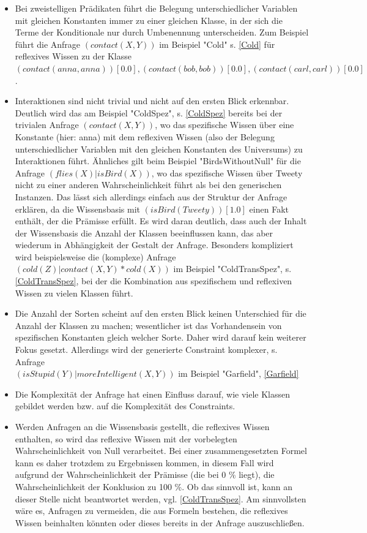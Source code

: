 \documentclass[draft]{scrreprt}
\begin{document}
\begin{itemize}
	\item Bei zweistelligen Prädikaten führt die Belegung unterschiedlicher Variablen mit gleichen Konstanten immer zu einer gleichen Klasse, in der sich die Terme der Konditionale nur durch Umbenennung unterscheiden. Zum Beispiel führt die Anfrage $ (contact(X,Y)) $ im Beispiel "{}Cold"{} s. \ref{Cold} für reflexives Wissen zu der Klasse $ (contact(anna,anna))[0.0], (contact(bob,bob))[0.0] , (contact(carl,carl))[0.0]  $.
	\item Interaktionen sind nicht trivial und nicht auf den ersten Blick erkennbar. Deutlich wird das am Beispiel "{}ColdSpez"{}, s. \ref{ColdSpez} bereits bei der trivialen Anfrage $ (contact(X,Y)) $, wo das spezifische Wissen über eine Konstante (hier: anna) mit dem reflexiven Wissen (also der Belegung unterschiedlicher Variablen mit den gleichen Konstanten des Universums) zu Interaktionen führt. Ähnliches gilt beim Beispiel "{}BirdsWithoutNull"{} für die Anfrage $ (flies(X) | isBird(X)) $, wo das spezifische Wissen über Tweety nicht zu einer anderen Wahrscheinlichkeit führt als bei den generischen Instanzen. Das lässt sich allerdings einfach aus der Struktur der Anfrage erklären, da die Wissensbasis mit $ (isBird(Tweety))[1.0] $ einen Fakt enthält, der die Prämisse erfüllt. Es wird daran deutlich, dass auch der Inhalt der Wissensbasis die Anzahl der Klassen beeinflussen kann, das aber wiederum in Abhängigkeit der Gestalt der Anfrage. Besonders kompliziert wird beispielsweise die (komplexe) Anfrage $ (cold(Z)|contact(X,Y) * cold(X)) $ im Beispiel "{}ColdTransSpez"{}, s. \ref{ColdTransSpez}, bei der die Kombination aus spezifischem und reflexiven Wissen zu vielen Klassen führt.
	\item Die Anzahl der Sorten scheint auf den ersten Blick keinen Unterschied für die Anzahl der Klassen zu machen; wesentlicher ist das Vorhandensein von spezifischen Konstanten gleich welcher Sorte. Daher wird darauf kein weiterer Fokus gesetzt. Allerdings wird der generierte Constraint komplexer, s. Anfrage \\ $ (isStupid(Y)|moreIntelligent(X,Y)) $ im Beispiel "{}Garfield"{}, \ref{Garfield}
	\item Die Komplexität der Anfrage hat einen Einfluss darauf, wie viele Klassen gebildet werden bzw. auf die Komplexität des Constraints. 	
	\item Werden Anfragen an die Wissensbasis gestellt, die reflexives Wissen enthalten, so wird das reflexive Wissen mit der vorbelegten Wahrscheinlichkeit von Null verarbeitet. Bei einer zusammengesetzten Formel kann es daher trotzdem zu Ergebnissen kommen, in diesem Fall wird aufgrund der Wahrscheinlichkeit der Prämisse (die bei 0 \% liegt), die Wahrscheinlichkeit der Konklusion zu 100 \%. Ob das sinnvoll ist, kann an dieser Stelle nicht beantwortet werden, vgl. \ref{ColdTransSpez}. Am sinnvollsten wäre es, Anfragen zu vermeiden, die aus Formeln bestehen, die reflexives Wissen beinhalten könnten oder dieses bereits in der Anfrage auszuschließen. 
	
\end{itemize}
\end{document}
